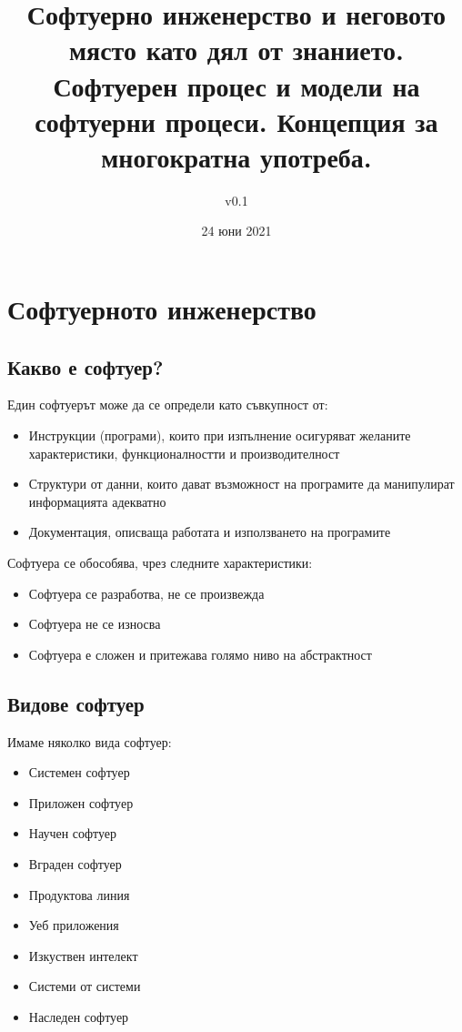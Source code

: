 \documentclass[fleqn,12pt]{article}
\title{Софтуерно инженерство и неговото място като дял от знанието. Софтуерен процес и модели на софтуерни процеси. Концепция за многократна употреба.}
\author{v0.1}
\date{24 юни 2021}
\begin{document}
\maketitle

\tableofcontents

\clearpage

\section{Софтуерното  инженерство}
\subsection{Какво  е  софтуер?}
Един софтуерът може да се определи като съвкупност от:
\begin{itemize}
	\item Инструкции (програми), които при изпълнение осигуряват желаните характеристики, функционалностти и производителност
	\item Структури от данни, които дават възможност на програмите да манипулират информацията адекватно
	\item Документация, описваща работата и използването на програмите
\end{itemize}

Софтуера се обособява, чрез следните характеристики:
\begin{itemize}
	\item Софтуера се разработва, не се произвежда
	\item Софтуера не се износва
	\item Софтуера е сложен и притежава голямо ниво на абстрактност
\end{itemize}

\subsection{Видове  софтуер}
Имаме няколко вида софтуер:
\begin{itemize}
	\item Системен софтуер
	\item Приложен софтуер
	\item Научен софтуер
	\item Вграден софтуер
	\item Продуктова линия
	\item Уеб приложения
	\item Изкуствен интелект
	\item Системи от системи
	\item Наследен софтуер
\end{itemize}
\end{document}
